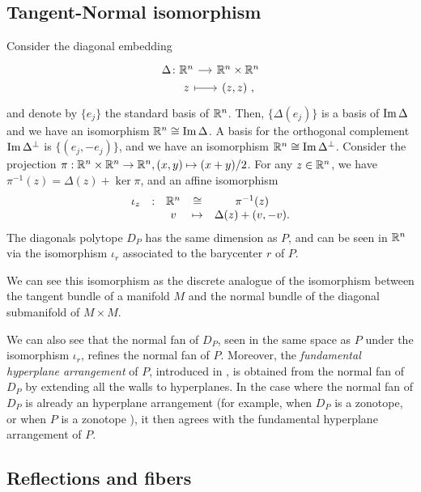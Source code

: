 \subsection{Tangent-Normal isomorphism}

Consider the diagonal embedding
\[
\begin{tikzcd}[row sep=0, column sep=small]
	\Delta \colon \R^n \arrow{r} & \R^n \times \R^n \\
	\phantom{\Delta \colon} z \arrow[r, |->] & (z,z) \ ,
\end{tikzcd}
\]
and denote by $\{e_j\}$ the standard basis of $\mathbb{R}^n$.
Then, $\{\Delta (e_j)\}$ is a basis of $\operatorname{\mathrm{Im}} \Delta$ and we have an isomorphism $\mathbb{R}^n \cong \operatorname{\mathrm{Im}} \Delta$.
A basis for the orthogonal complement $\operatorname{\mathrm{Im}} \Delta^{\bot}$ is $\{(e_j,-e_j)\}$, and we have an isomorphism $\mathbb{R}^n \cong \operatorname{\mathrm{Im}} \Delta^{\bot}$.
Consider the projection $\pi : \mathbb{R}^n \times \mathbb{R}^n \to \mathbb{R}^n, (x,y) \mapsto (x+y)/2$. 
For any $z \in \mathbb{R}^n$, we have $\pi^{-1}(z)=\Delta(z)+\ker \pi$, and an affine isomorphism
\begin{equation} \label{eq:D_P-iso}
	\begin{matrix}
		\iota_z & : & \mathbb{R}^n & \cong & \pi^{-1}(z) \\
		& & v & \mapsto & \Delta(z)+(v,-v).
	\end{matrix}
\end{equation}
The diagonals polytope $D_P$ has the same dimension as $P$, and can be seen in $\mathbb{R}^n$ via the isomorphism $\iota_r$ associated to the barycenter $r$ of $P$.

\begin{remark}
	We can see this isomorphism as the discrete analogue of the isomorphism between the tangent bundle of a manifold $M$ and the normal bundle of the diagonal submanifold of $M\times M$.
\end{remark}

We can also see that the normal fan of $D_P$, seen in the same space as $P$ under the isomorphism $\iota_r$, refines the normal fan of $P$.
Moreover, the \emph{fundamental hyperplane arrangement} of $P$, introduced in \cite[Definition 1.18]{GLA21}, is obtained from the normal fan of $D_P$ by extending all the walls to hyperplanes.
In the case where the normal fan of $D_P$ is already an hyperplane arrangement (for example, when $D_P$ is a zonotope, or when $P$ is a zonotope ), it then agrees with the fundamental hyperplane arrangement of $P$.

\subsection{Reflections and fibers}

